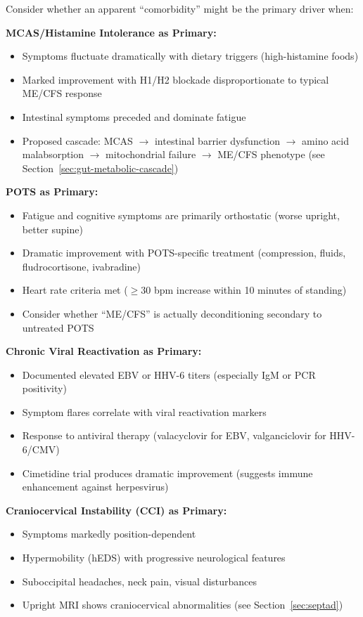 \begin{observation}
\label{obs:comorbidity-primary}
Consider whether an apparent ``comorbidity'' might be the primary driver when:

\textbf{MCAS/Histamine Intolerance as Primary:}
\begin{itemize}
    \item Symptoms fluctuate dramatically with dietary triggers (high-histamine foods)
    \item Marked improvement with H1/H2 blockade disproportionate to typical ME/CFS response
    \item Intestinal symptoms preceded and dominate fatigue
    \item Proposed cascade: MCAS $\rightarrow$ intestinal barrier dysfunction $\rightarrow$ amino acid malabsorption $\rightarrow$ mitochondrial failure $\rightarrow$ ME/CFS phenotype (see Section~\ref{sec:gut-metabolic-cascade})
\end{itemize}

\textbf{POTS as Primary:}
\begin{itemize}
    \item Fatigue and cognitive symptoms are primarily orthostatic (worse upright, better supine)
    \item Dramatic improvement with POTS-specific treatment (compression, fluids, fludrocortisone, ivabradine)
    \item Heart rate criteria met ($\geq$30 bpm increase within 10 minutes of standing)
    \item Consider whether ``ME/CFS'' is actually deconditioning secondary to untreated POTS
\end{itemize}

\textbf{Chronic Viral Reactivation as Primary:}
\begin{itemize}
    \item Documented elevated EBV or HHV-6 titers (especially IgM or PCR positivity)
    \item Symptom flares correlate with viral reactivation markers
    \item Response to antiviral therapy (valacyclovir for EBV, valganciclovir for HHV-6/CMV)
    \item Cimetidine trial produces dramatic improvement (suggests immune enhancement against herpesvirus)
\end{itemize}

\textbf{Craniocervical Instability (CCI) as Primary:}
\begin{itemize}
    \item Symptoms markedly position-dependent
    \item Hypermobility (hEDS) with progressive neurological features
    \item Suboccipital headaches, neck pain, visual disturbances
    \item Upright MRI shows craniocervical abnormalities (see Section~\ref{sec:septad})
\end{itemize}
\end{observation}

